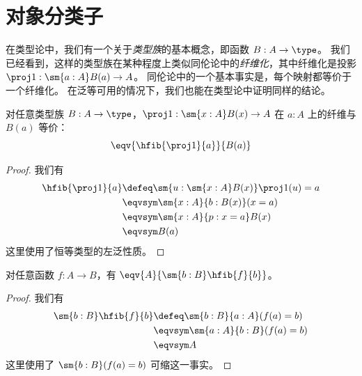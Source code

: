 %
\section{对象分类子}
\label{sec:object-classification}

在类型论中，我们有一个关于\emph{类型族}的基本概念，即函数 $B:A\to\type$。
我们已经看到，这样的类型族在某种程度上类似同伦论中的\emph{纤维化}，其中纤维化是投影 $\proj1:\sm{a:A} B(a) \to A$。
同伦论中的一个基本事实是，每个映射都等价于一个纤维化。
在泛等可用的情况下，我们也能在类型论中证明同样的结论。

\begin{lem}\label{thm:fiber-of-a-fibration}
  对任意类型族 $B:A\to\type$，$\proj1:\sm{x:A} B(x) \to A$ 在 $a:A$ 上的纤维与 $B(a)$ 等价：
  \[ \eqv{\hfib{\proj1}{a}}{B(a)} \]
\end{lem}
\begin{proof}
  我们有
  \begin{align*}
    \hfib{\proj1}{a} &\defeq \sm{u:\sm{x:A} B(x)} \proj1(u)=a\\
    &\eqvsym \sm{x:A}{b:B(x)} (x=a)\\
    &\eqvsym \sm{x:A}{p:x=a} B(x)\\
    &\eqvsym B(a)
  \end{align*}
  这里使用了恒等类型的左泛性质。
\end{proof}

\begin{lem}\label{thm:total-space-of-the-fibers}
  对任意函数 $f:A\to B$，有 $\eqv{A}{\sm{b:B}\hfib{f}{b}}$。
\end{lem}
\begin{proof}
  我们有
  \begin{align*}
    \sm{b:B}\hfib{f}{b} &\defeq \sm{b:B}{a:A} (f(a)=b)\\
    &\eqvsym \sm{a:A}{b:B} (f(a)=b)\\
    &\eqvsym A
  \end{align*}
  这里使用了 $\sm{b:B} (f(a)=b)$ 可缩这一事实。
\end{proof}


